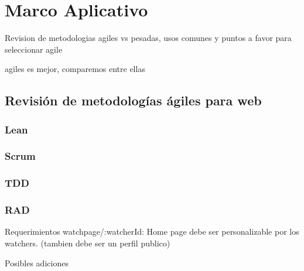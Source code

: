 \section{Marco Aplicativo}

Revision de metodologias agiles vs pesadas, usos comunes y puntos a favor para seleccionar agile

agiles es mejor, comparemos entre ellas
\cite{ComparacionFrameworks}
\subsection{Revisión de metodologías ágiles para web }

\subsubsection{Lean}
\subsubsection{Scrum}
\subsubsection{TDD}
\subsubsection{RAD}



Requerimientos
watchpage/:watcherId: Home page debe ser personalizable por los watchers. (tambien debe ser un perfil publico)


Posibles adiciones

